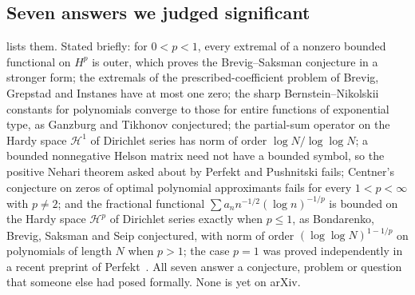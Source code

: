 \documentclass[11pt]{amsart}
\begin{document}
\subsection{Seven answers we judged significant}
 lists them. Stated briefly: for $0<p<1$, every extremal of a
nonzero bounded functional on $H^p$ is outer, which proves the Brevig--Saksman
conjecture in a stronger form; the extremals of the prescribed-coefficient
problem of Brevig, Grepstad and Instanes have at most one zero; the sharp
Bernstein--Nikolskii constants for polynomials converge to those for entire
functions of exponential type, as Ganzburg and Tikhonov conjectured; the
partial-sum operator on the Hardy space $\mathcal H^1$ of Dirichlet series has
norm of order $\log N/\log\log N$; a bounded nonnegative Helson matrix need not
have a bounded symbol, so the positive Nehari theorem asked about by Perfekt
and Pushnitski fails; Centner's conjecture on zeros of optimal polynomial
approximants fails for every $1<p<\infty$ with $p\ne2$; and the fractional
functional $\sum a_n n^{-1/2}(\log n)^{-1/p}$ is bounded on the Hardy space
$\mathcal H^p$ of Dirichlet series exactly when $p\le1$, as Bondarenko, Brevig,
Saksman and Seip conjectured, with norm of order $(\log\log N)^{1-1/p}$ on
polynomials of length $N$ when $p>1$; the case $p=1$ was proved independently
in a recent preprint of Perfekt~\cite{perfekt-fr}. All seven answer a
conjecture, problem or question that someone else had posed formally. None is
yet on arXiv.
\end{document}

